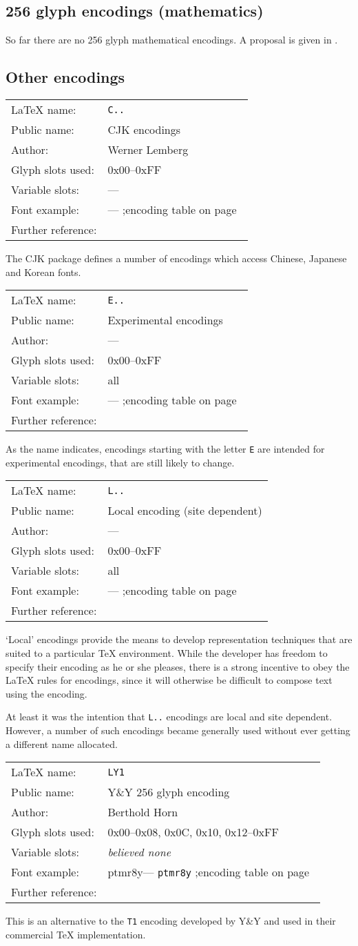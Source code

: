 \documentclass{ltxguide}[1994/11/20]
\makeatletter
\providecommand{\Enc}[1]{\texttt{#1}}
\providecommand{\Pkg}[1]{%
  \textsf{#1}}
\newenvironment{encodinginfo}[7]%
  {\noindent
   \begin{tabularx}{\linewidth}{@{}l>{\raggedright\let\\\tabularnewline}X}%
     \LaTeX{} name:          & \texttt{#1}\\%
     Public name:          & #2\\%
     Author:                   & #3\\%
     Glyph slots used: & #4\\%
     Variable slots:     & #5\\%
     Font example:     & \def\@tempa{#6}\ifx\@tempa\@empty---%
                            \else\texttt{#6}\referenceftable{#6}\fi\\%
     Further reference:                & #7%
   \end{tabularx}%
   \par\nobreak
   \vspace*{3pt}%
   \quote
  }%
  {\endquote
   \vspace{6pt}}
\def\referenceftable#1{
  \@ifundefined{r@fonttable:#1}%
  \relax
  {;\space encoding table on page~\pageref{fonttable:#1}}%
}
\makeatother
\begin{document}
\subsection{256 glyph encodings (mathematics)}

So far there are no 256 glyph mathematical encodings. A proposal is
given in \cite{ziegler}.


\subsection{Other encodings}

\begin{encodinginfo}
  {C..}
  {CJK encodings}
  {Werner Lemberg}
  {0x00--0xFF}
  {---}
  {} %
  {\cite{CJK}}

  The \Pkg{CJK} package defines a number of encodings which access Chinese,
  Japanese and Korean fonts.

\end{encodinginfo}

\begin{encodinginfo}
  {E..}
  {Experimental encodings}
  {---}
  {0x00--0xFF}
  {all}
  {}
  {\cite[p.416]{A-W:MG2004}}

  As the name indicates, encodings starting with the letter \Enc{E} are
  intended for experimental encodings, that are still likely to change.
\end{encodinginfo}

\begin{encodinginfo}{L..}
        {Local encoding (site dependent)}
        {---}
        {0x00--0xFF}
        {all}
        {}
        {\cite[p.416]{A-W:MG2004}}

        `Local' encodings provide the means to develop representation
        techniques that are suited to a particular \TeX{} environment.  While
        the developer has freedom to specify their encoding as he or she
        pleases, there is a strong incentive to obey the \LaTeX{} rules for
        encodings, since it will otherwise be difficult to compose text using
        the encoding.

        At least it was the intention that \Enc{L..} encodings are local and
        site dependent. However, a number of such encodings became generally
        used without ever getting a different name allocated.

\end{encodinginfo}



\begin{encodinginfo}{LY1}
        {Y\&Y 256 glyph encoding}
        {Berthold Horn}
        {0x00--0x08, 0x0C, 0x10, 0x12--0xFF}
        {\emph{believed none}}
        {ptmr8y}
        {\cite[p.416]{A-W:MG2004}}

        This is an alternative to the \Enc{T1} encoding developed by Y\&Y and
        used in their commercial \TeX{} implementation.

\end{encodinginfo}
\end{document}
